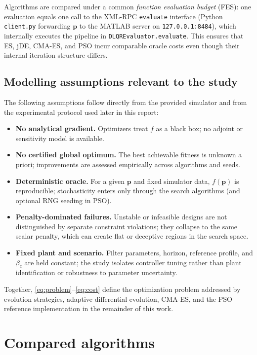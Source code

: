 \documentclass[pdflatex,sn-mathphys-num]{sn-jnl}
\begin{document}
Algorithms are compared under a common \emph{function evaluation budget} (FES): one evaluation equals one call to the XML-RPC \texttt{evaluate} interface (Python \texttt{client.py} forwarding $\mathbf{p}$ to the MATLAB server on \texttt{127.0.0.1:8484}), which internally executes the pipeline in \texttt{DLQREvaluator.evaluate}.
This ensures that ES, jDE, CMA-ES, and PSO incur comparable oracle costs even though their internal iteration structure differs.

\subsection{Modelling assumptions relevant to the study}\label{subsec:assumptions}

The following assumptions follow directly from the provided simulator and from the experimental protocol used later in this report:
\begin{itemize}
  \item \textbf{No analytical gradient.} Optimizers treat $f$ as a black box; no adjoint or sensitivity model is available.
  \item \textbf{No certified global optimum.} The best achievable fitness is unknown a priori; improvements are assessed empirically across algorithms and seeds.
  \item \textbf{Deterministic oracle.} For a given $\mathbf{p}$ and fixed simulator data, $f(\mathbf{p})$ is reproducible; stochasticity enters only through the search algorithms (and optional RNG seeding in PSO).
  \item \textbf{Penalty-dominated failures.} Unstable or infeasible designs are not distinguished by separate constraint violations; they collapse to the same scalar penalty, which can create flat or deceptive regions in the search space.
  \item \textbf{Fixed plant and scenario.} Filter parameters, horizon, reference profile, and $\beta_c$ are held constant; the study isolates controller tuning rather than plant identification or robustness to parameter uncertainty.
\end{itemize}

Together, \eqref{eq:problem}--\eqref{eq:cost} define the optimization problem addressed by evolution strategies, adaptive differential evolution, CMA-ES, and the PSO reference implementation in the remainder of this work.

\section{Compared algorithms}\label{sec:algorithms}
\end{document}
